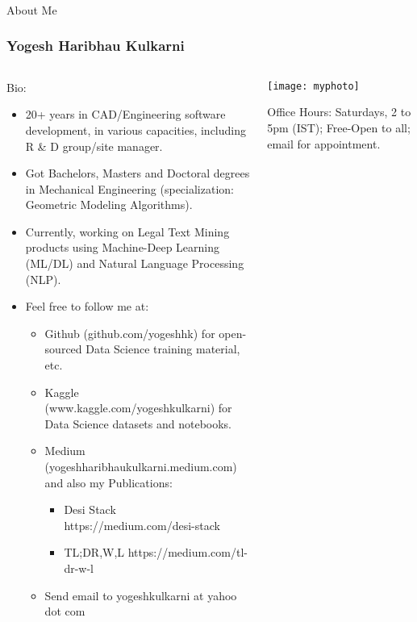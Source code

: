 \begin{frame}[fragile]\frametitle{}
\begin{center}
{\Large About Me}
\end{center}
\end{frame}

\begin{frame}[fragile]\frametitle{Yogesh Haribhau Kulkarni}
\begin{columns}
    \begin{column}[T]{0.6\linewidth}
		Bio:
      \begin{itemize}
		\item 20+ years in CAD/Engineering software development, in various capacities, including R \& D group/site manager. 
		\item Got Bachelors, Masters and Doctoral degrees in Mechanical Engineering (specialization: Geometric Modeling Algorithms). 
		\item Currently, working on Legal Text Mining products using Machine-Deep Learning (ML/DL) and Natural Language Processing (NLP).
		\item Feel free to follow me at:
      \begin{itemize}
			\item Github (github.com/yogeshhk) for open-sourced Data Science training material, etc.
			\item Kaggle (www.kaggle.com/yogeshkulkarni) for Data Science datasets and notebooks.
			\item Medium (yogeshharibhaukulkarni.medium.com) and also my Publications:
				\begin{itemize}
				\item Desi Stack https://medium.com/desi-stack
				\item TL;DR,W,L https://medium.com/tl-dr-w-l
				\end{itemize}
			\item Send email to yogeshkulkarni at yahoo dot com
			\end{itemize}
	  \end{itemize}


    \end{column}
    \begin{column}[T]{0.4\linewidth}
      \centering
      \texttt{[image: myphoto]}
			
			Office Hours: Saturdays, 2 to 5pm (IST); Free-Open to all; email for appointment.
    \end{column}
  \end{columns}

\end{frame}


